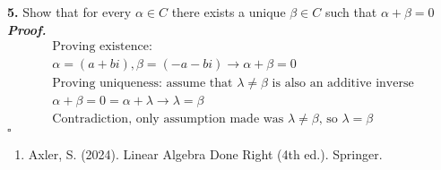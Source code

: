 \documentclass[12pt]{article} %
\newenvironment{solution}[1][\it{Proof}]{\textbf{#1. } }{$\square$}
\begin{document}
\textbf{5.} Show that for every $\alpha \in C$ there exists a unique $\beta \in C$ such that $\alpha + \beta = 0$ \\ 

\begin{solution}
\begin{align*}
    &\text{Proving existence: } & \\
    &\alpha = (a+bi), \beta = (-a-bi) \rightarrow \alpha + \beta = 0 & \\
    &\text{Proving uniqueness: assume that $\lambda \ne \beta$ is also an additive inverse} & \\
    &\alpha + \beta = 0 = \alpha + \lambda \rightarrow \lambda = \beta & \\
    &\text{Contradiction, only assumption made was $\lambda \ne \beta$, so $\lambda = \beta$ }
\end{align*}
\end{solution}

\newpage


\begin{enumerate}
    \item Axler, S. (2024). Linear Algebra Done Right (4th ed.). Springer.
\end{enumerate}
\end{document}
